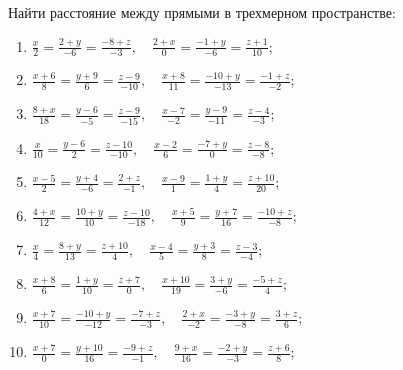 	\vspace{15pt}
	Найти расстояние между прямыми в трехмерном пространстве:

	\begin{enumerate}
		\setcounter{enumi}{\value{tasks}}
		
			\item \( \displaystyle \frac{x}{2} = \frac{2+y}{-6} = \frac{-8+z}{-3}, \quad \frac{2+x}{0} = \frac{-1+y}{-6} = \frac{z+1}{10} \);
			\item \( \displaystyle \frac{x+6}{8} = \frac{y+9}{6} = \frac{z-9}{-10}, \quad \frac{x+8}{11} = \frac{-10+y}{-13} = \frac{-1+z}{-2} \);
			\item \( \displaystyle \frac{8+x}{18} = \frac{y-6}{-5} = \frac{z-9}{-15}, \quad \frac{x-7}{-2} = \frac{y-9}{-11} = \frac{z-4}{-3} \);
			\item \( \displaystyle \frac{x}{10} = \frac{y-6}{2} = \frac{z-10}{-10}, \quad \frac{x-2}{6} = \frac{-7+y}{0} = \frac{z-8}{-8} \);
			\item \( \displaystyle \frac{x-5}{2} = \frac{y+4}{-6} = \frac{2+z}{-1}, \quad \frac{x-9}{1} = \frac{1+y}{4} = \frac{z+10}{20} \);
			\item \( \displaystyle \frac{4+x}{12} = \frac{10+y}{10} = \frac{z-10}{-18}, \quad \frac{x+5}{9} = \frac{y+7}{16} = \frac{-10+z}{-8} \);
			\item \( \displaystyle \frac{x}{4} = \frac{8+y}{13} = \frac{z+10}{4}, \quad \frac{x-4}{5} = \frac{y+3}{8} = \frac{z-3}{-4} \);
			\item \( \displaystyle \frac{x+8}{6} = \frac{1+y}{10} = \frac{z+7}{0}, \quad \frac{x+10}{19} = \frac{3+y}{-6} = \frac{-5+z}{4} \);
			\item \( \displaystyle \frac{x+7}{10} = \frac{-10+y}{-12} = \frac{-7+z}{-3}, \quad \frac{2+x}{-2} = \frac{-3+y}{-8} = \frac{3+z}{6} \);
			\item \( \displaystyle \frac{x+7}{0} = \frac{y+10}{16} = \frac{-9+z}{-1}, \quad \frac{9+x}{16} = \frac{-2+y}{-3} = \frac{z+6}{8} \);
		
		\setcounter{tasks}{\value{enumi}}
	\end{enumerate}